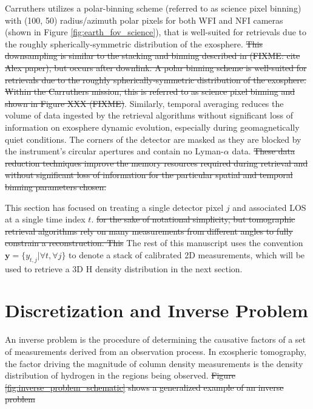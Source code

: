 \documentclass[pdflatex,twocolumn,sn-mathphys-num]{sn-jnl}
\newcommand{\st}[1]{{\color{red}\sout{#1}}}
\begin{document}
  Carruthers utilizes a polar-binning scheme (referred to as science pixel binning) with (100, 50) radius/azimuth polar pixels for both WFI and NFI cameras (shown in Figure \ref{fig:earth_fov_science}), that is well-suited for retrievals due to the roughly spherically-symmetric distribution of the exosphere.
  \st{This downsampling is similar to the stacking and binning described in (FIXME: cite Alex paper), but occurs after downlink.  A polar binning scheme is well-suited for retrievals due to the roughly spherically-symmetric distribution of the exosphere.  Within the Carruthers mission, this is referred to as science pixel binning and shown in Figure XXX (FIXME)}.
Similarly, temporal averaging reduces the volume of data ingested by the retrieval algorithms without significant loss of information on exosphere dynamic evolution, especially during geomagnetically quiet conditions.  The corners of the detector are masked as they are blocked by the instrument's circular apertures and contain no Lyman-$\alpha$ data.  \st{These data reduction techniques improve the memory resources required during retrieval and without significant loss of information for the particular spatial and temporal binning parameters chosen.}

    This section has focused on treating a single detector pixel $j$ and associated LOS at a single time index $t$. \st{for the sake of notational simplicity, but tomographic retrieval algorithms rely on many measurements from different angles to fully constrain a reconstruction.
    This} The rest of this manuscript uses the convention $\bm{y} = \{y_{t,j} | \forall t, \forall j\}$ to denote a stack of calibrated 2D measurements, which will be used to retrieve a 3D H density distribution in the next section.




\section{Discretization and Inverse Problem}\label{sec:inverse_problem}

An inverse problem is the procedure of determining the causative factors of a set of measurements derived from an observation process.  In exospheric tomography, the factor driving the magnitude of column density measurements is the density distribution of hydrogen in the regions being observed.  \st{Figure \ref{fig:inverse_problem_schematic} shows a generalized example of an inverse problem}
\end{document}
